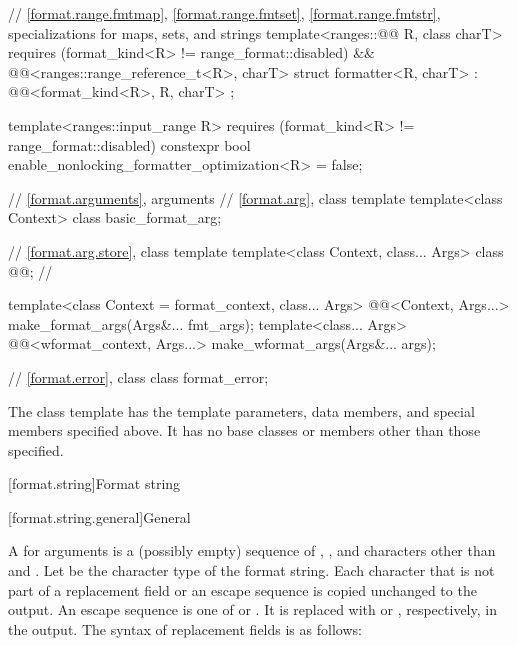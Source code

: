 \begin{codeblock}
{  // \ref{format.range.fmtmap}, \ref{format.range.fmtset}, \ref{format.range.fmtstr}, specializations for maps, sets, and strings
  template<ranges::@@ R, class charT>
    requires (format_kind<R> != range_format::disabled) &&
             @@<ranges::range_reference_t<R>, charT>
  struct formatter<R, charT> : @@<format_kind<R>, R, charT> { };

  template<ranges::input_range R>
      requires (format_kind<R> != range_format::disabled)
    constexpr bool enable_nonlocking_formatter_optimization<R> = false;

  // \ref{format.arguments}, arguments
  // \ref{format.arg}, class template 
  template<class Context> class basic_format_arg;

  // \ref{format.arg.store}, class template 
  template<class Context, class... Args> class @@;        // \expos

  template<class Context = format_context, class... Args>
    @@<Context, Args...>
      make_format_args(Args&... fmt_args);
  template<class... Args>
    @@<wformat_context, Args...>
      make_wformat_args(Args&... args);

  // \ref{format.error}, class 
  class format_error;
}
\end{codeblock}


\pnum
The class template 
has the template parameters, data members, and special members specified above. It has no base classes or members other than those specified.

[format.string]{Format string}

[format.string.general]{General}

\pnum
A  for arguments  is
a (possibly empty) sequence of
,
,
and characters other than \tcode{\{} and \tcode{\}}.
Let  be the character type of the format string.
Each character that is not part of
a replacement field or an escape sequence
is copied unchanged to the output.
An escape sequence is one of \tcode{\{\{} or \tcode{\}\}}.
It is replaced with \tcode{\{} or \tcode{\}}, respectively, in the output.
The syntax of replacement fields is as follows:

